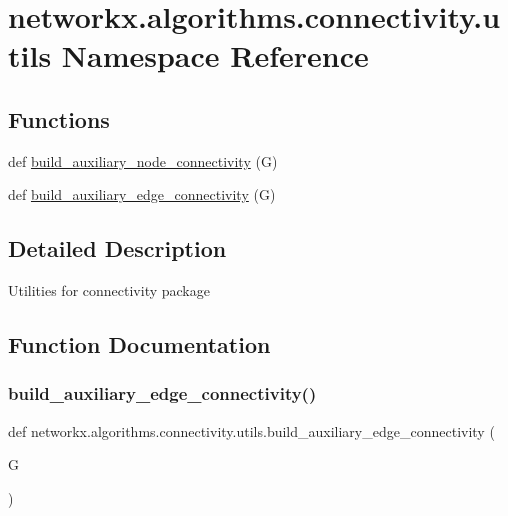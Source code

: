\hypertarget{namespacenetworkx_1_1algorithms_1_1connectivity_1_1utils}{}\section{networkx.\+algorithms.\+connectivity.\+utils Namespace Reference}
\label{namespacenetworkx_1_1algorithms_1_1connectivity_1_1utils}
\subsection*{Functions}
\begin{DoxyCompactItemize}
\item 
def \hyperlink{namespacenetworkx_1_1algorithms_1_1connectivity_1_1utils_adbf9ea0c5fa544037c750c236fda8705}{build\+\_\+auxiliary\+\_\+node\+\_\+connectivity} (G)
\item 
def \hyperlink{namespacenetworkx_1_1algorithms_1_1connectivity_1_1utils_a088f23fb3d05b4e8644b9934b51d48f0}{build\+\_\+auxiliary\+\_\+edge\+\_\+connectivity} (G)
\end{DoxyCompactItemize}


\subsection{Detailed Description}
\begin{DoxyVerb}Utilities for connectivity package
\end{DoxyVerb}
 

\subsection{Function Documentation}
\mbox{\label{namespacenetworkx_1_1algorithms_1_1connectivity_1_1utils_a088f23fb3d05b4e8644b9934b51d48f0}} 
\subsubsection{\texorpdfstring{build\+\_\+auxiliary\+\_\+edge\+\_\+connectivity()}{build\_auxiliary\_edge\_connectivity()}}
{\footnotesize\ttfamily def networkx.\+algorithms.\+connectivity.\+utils.\+build\+\_\+auxiliary\+\_\+edge\+\_\+connectivity (\begin{DoxyParamCaption}\item[{}]{G }\end{DoxyParamCaption})}

